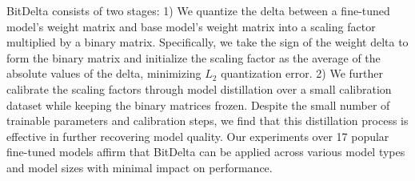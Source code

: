 \documentclass[numbers]{article}
\newcommand{\oursmethod}{BitDelta\xspace}
\begin{document}
\begin{table}[htbp]
    \centering
    \caption{Comparison between \oursmethod and a SVD based method, with \textit{Llama 2-7B} and \textit{Llama 2-7B Chat} as the base and fine-tuned models. \oursmethod is performant across the board, whereas the SVD-based method fails to sufficiently capture the fine-tuned information.}
    \label{lora-results}
\end{table}

\oursmethod consists of two stages: 1) We quantize the delta between a fine-tuned model's weight matrix and base model's weight matrix into a scaling factor multiplied by a binary matrix. Specifically, we take the sign of the weight delta to form the binary matrix and initialize the scaling factor as the average of the absolute values of the delta, minimizing $L_2$ quantization error. 2) We further calibrate the scaling factors through model distillation over a small calibration dataset while keeping the binary matrices frozen. Despite the small number of trainable parameters and calibration steps, we find that this distillation process is effective in further recovering model quality. Our experiments over 17 popular fine-tuned models affirm that \oursmethod can be applied across various model types and model sizes with minimal impact on performance.
\end{document}

